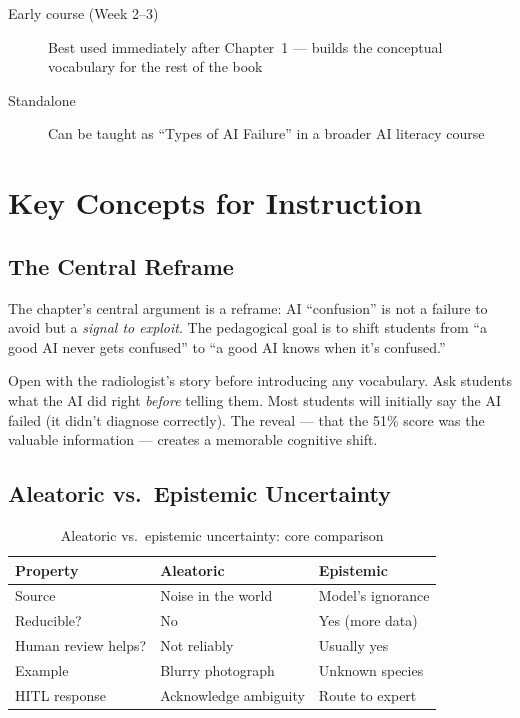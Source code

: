 \begin{description}
    \item[Early course (Week 2--3)] Best used immediately after Chapter~1 --- builds the conceptual vocabulary for the rest of the book
    \item[Standalone] Can be taught as ``Types of AI Failure'' in a broader AI literacy course
\end{description}

\section{Key Concepts for Instruction}

\subsection{The Central Reframe}

The chapter's central argument is a reframe: AI ``confusion'' is not a failure to avoid but a \emph{signal to exploit}. The pedagogical goal is to shift students from ``a good AI never gets confused'' to ``a good AI knows when it's confused.''

\begin{technote}
Open with the radiologist's story before introducing any vocabulary. Ask students what the AI did right \emph{before} telling them. Most students will initially say the AI failed (it didn't diagnose correctly). The reveal --- that the 51\% score was the valuable information --- creates a memorable cognitive shift.
\end{technote}

\subsection{Aleatoric vs.\ Epistemic Uncertainty}

\begin{table}[htbp]
\caption{Aleatoric vs.\ epistemic uncertainty: core comparison}
\label{tab:uncertainty-types}
\centering
\begin{tabular}{@{}p{3cm}p{4cm}p{4cm}@{}}
\toprule
\textbf{Property} & \textbf{Aleatoric} & \textbf{Epistemic} \\
\midrule
Source & Noise in the world & Model's ignorance \\
Reducible? & No & Yes (more data) \\
Human review helps? & Not reliably & Usually yes \\
Example & Blurry photograph & Unknown species \\
HITL response & Acknowledge ambiguity & Route to expert \\
\bottomrule
\end{tabular}
\end{table}

